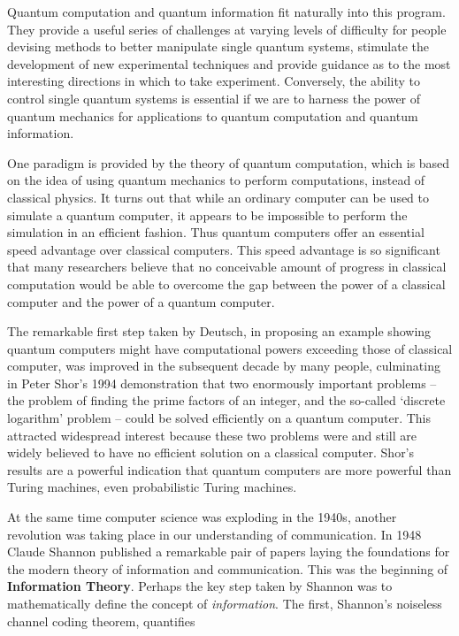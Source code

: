 \documentclass[20pt]{report}
\begin{document}
\par Quantum computation and quantum information fit naturally into this program. They provide a useful series of challenges at varying levels of difficulty for people devising methods to better manipulate single quantum systems, stimulate the development of new experimental techniques and provide guidance as to the most interesting directions in which to take experiment. Conversely, the ability to control single quantum systems is essential if we are to harness the power of quantum mechanics for applications to quantum computation and quantum information. 
\par One paradigm is provided by the theory of quantum computation, which is based on the idea of using quantum mechanics to perform computations, instead of classical physics. It turns out that while an ordinary computer can be used to simulate a quantum computer, it appears to be impossible to perform the simulation in an efficient fashion. Thus quantum computers offer an essential speed advantage over classical computers. This speed advantage is so significant that many researchers believe that no conceivable amount of progress in classical computation would be able to overcome the gap between the power of a classical computer and the power of a quantum computer.
\par
The remarkable first step taken by Deutsch, in proposing an example showing quantum computers might have computational powers exceeding those of classical computer, was improved in the subsequent decade by many people, culminating in Peter Shor’s 1994 demonstration that two enormously important problems – the problem of finding the prime factors of an integer, and the so-called ‘discrete logarithm’ problem – could be solved efficiently on a quantum computer. This attracted widespread interest because these two problems were and still are widely believed to have no efficient solution on a classical computer. Shor’s results are a powerful indication that quantum computers are more powerful than Turing machines, even probabilistic Turing machines.
\par
At the same time computer science was exploding in the 1940s, another revolution was taking place in our understanding of communication. In 1948 Claude Shannon published a remarkable pair of papers laying the foundations for the modern theory of information and communication. This was the beginning of \textbf{Information Theory}. Perhaps the key step taken by Shannon was to mathematically define the concept of \textit{information}. The first, Shannon’s noiseless channel coding theorem, quantifies
\end{document}
